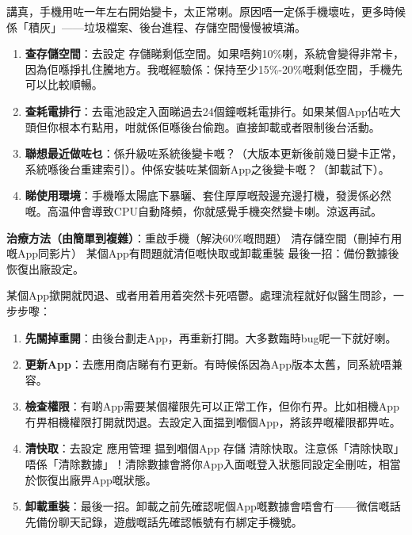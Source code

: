 


講真，手機用咗一年左右開始變卡，太正常喇。原因唔一定係手機壞咗，更多時候係「積灰」——垃圾檔案、後台進程、存儲空間慢慢被填滿。


\begin{enumerate}
  \item \textbf{查存儲空間}：去設定 存儲睇剩低空間。如果唔夠10\%喇，系統會變得非常卡，因為佢喺掙扎住騰地方。我嘅經驗係：保持至少15\%-20\%嘅剩低空間，手機先可以比較順暢。
  \item \textbf{查耗電排行}：去電池設定入面睇過去24個鐘嘅耗電排行。如果某個App佔咗大頭但你根本冇點用，咁就係佢喺後台偷跑。直接卸載或者限制後台活動。
  \item \textbf{聯想最近做咗乜}：係升級咗系統後變卡嘅？（大版本更新後前幾日變卡正常，系統喺後台重建索引）。仲係安裝咗某個新App之後變卡嘅？（卸載試下）。
  \item \textbf{睇使用環境}：手機喺太陽底下暴曬、套住厚厚嘅殼邊充邊打機，發燙係必然嘅。高温仲會導致CPU自動降頻，你就感覺手機突然變卡喇。涼返再試。
\end{enumerate}

\textbf{治療方法（由簡單到複雜）}：重啟手機（解決60\%嘅問題） 清存儲空間（刪掉冇用嘅App同影片） 某個App有問題就清佢嘅快取或卸載重裝 最後一招：備份數據後恢復出廠設定。


某個App撳開就閃退、或者用着用着突然卡死唔鬱。處理流程就好似醫生問診，一步步嚟：

\begin{enumerate}
  \item \textbf{先關掉重開}：由後台劃走App，再重新打開。大多數臨時bug呢一下就好喇。
  \item \textbf{更新App}：去應用商店睇有冇更新。有時候係因為App版本太舊，同系統唔兼容。
  \item \textbf{檢查權限}：有啲App需要某個權限先可以正常工作，但你冇畀。比如相機App冇畀相機權限打開就閃退。去設定入面揾到嗰個App，將該畀嘅權限都畀咗。
  \item \textbf{清快取}：去設定 應用管理 揾到嗰個App 存儲 清除快取。注意係「清除快取」唔係「清除數據」！清除數據會將你App入面嘅登入狀態同設定全刪咗，相當於恢復出廠畀App嘅狀態。
  \item \textbf{卸載重裝}：最後一招。卸載之前先確認呢個App嘅數據會唔會冇——微信嘅話先備份聊天記錄，遊戲嘅話先確認帳號有冇綁定手機號。
\end{enumerate}

